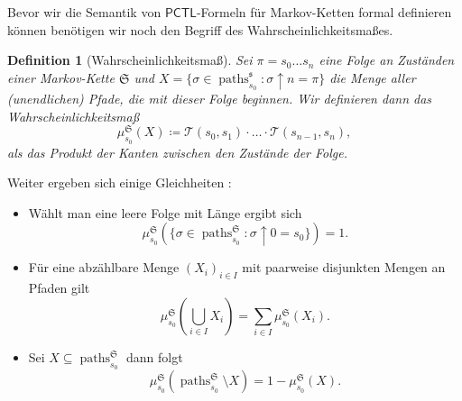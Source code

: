 \documentclass{lni}
\theoremstyle{def_style}
\newtheorem{definition}{Definition}[section]
\theoremstyle{break}
\newcommand{\paths}[2]{\operatorname{paths}^{#1}_{#2}}
\newcommand{\PCTL}{\mathsf{PCTL}}
\begin{document}
Bevor wir die Semantik von $\PCTL$-Formeln für Markov-Ketten formal definieren können benötigen wir noch den Begriff des Wahrscheinlichkeitsmaßes.

\begin{definition}[Wahrscheinlichkeitsmaß]
	 Sei $\pi = s_0\dots s_n$ eine Folge an Zuständen einer Markov-Kette $\mathfrak{S}$ und $X=\{\sigma\in \paths{\mathfrak{s}}{s_0} : \sigma\uparrow n = \pi\}$ die Menge aller (unendlichen) Pfade, die mit dieser Folge beginnen. Wir definieren dann das Wahrscheinlichkeitsmaß 
	 $$\mu^{\mathfrak{S}}_{s_0}(X)\coloneqq\mathcal{T}(s_0,s_1)\cdot \dots \cdot \mathcal{T}(s_{n-1},s_n),$$
	 als das Produkt der Kanten zwischen den Zustände der Folge. \cite{hansson1994logic}
\end{definition}

Weiter ergeben sich einige Gleichheiten \cite{hansson1994logic}:
\begin{itemize}
	\item Wählt man eine leere Folge mit Länge ergibt sich
	\begin{equation}\mu^\mathfrak{S}_{s_0}(\{\sigma\in \paths{\mathfrak{S}}{s_0} : \sigma\uparrow 0 = s_0\})=1.\end{equation}
	\item Für eine abzählbare Menge $(X_i)_{i\in I}$ mit paarweise disjunkten Mengen an Pfaden gilt
	\begin{equation}\mu^\mathfrak{S}_{s_0}(\bigcup_{i\in I}X_i) = \sum_{i\in I}\mu^\mathfrak{S}_{s_0}(X_i).\end{equation}
	\item Sei $X\subseteq \paths{\mathfrak{S}}{s_0}$ dann folgt 
	\begin{equation}\mu^\mathfrak{S}_{s_0}(\paths{\mathfrak{S}}{s_0} \setminus X) = 1-\mu^\mathfrak{S}_{s_0}(X).\label{MassUmkehrung}\end{equation}
\end{itemize}
\end{document}
